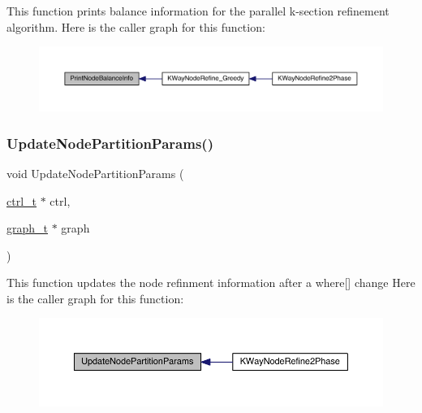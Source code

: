 This function prints balance information for the parallel k-\/section refinement algorithm. Here is the caller graph for this function\+:\nopagebreak
\begin{figure}[H]
\begin{center}
\leavevmode
\includegraphics[width=350pt]{a00383_a209dbc8b8ae14de6f02ff22f00a60d3c_icgraph}
\end{center}
\end{figure}
\mbox{\label{a00383_a78090b8f3c50c64cc9541791df72d3cb}} 
\subsubsection{\texorpdfstring{Update\+Node\+Partition\+Params()}{UpdateNodePartitionParams()}}
{\footnotesize\ttfamily void Update\+Node\+Partition\+Params (\begin{DoxyParamCaption}\item[{\hyperlink{a00742}{ctrl\+\_\+t} $\ast$}]{ctrl,  }\item[{\hyperlink{a00734}{graph\+\_\+t} $\ast$}]{graph }\end{DoxyParamCaption})}

This function updates the node refinment information after a where\mbox{[}\mbox{]} change Here is the caller graph for this function\+:\nopagebreak
\begin{figure}[H]
\begin{center}
\leavevmode
\includegraphics[width=350pt]{a00383_a78090b8f3c50c64cc9541791df72d3cb_icgraph}
\end{center}
\end{figure}
